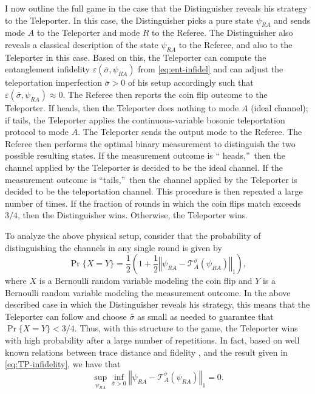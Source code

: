 \documentclass[apsrev,twocolumn]{revtex4-1}%
\begin{document}
I now outline the full game in the case that the Distinguisher reveals his
strategy to the Teleporter. In this case, the Distinguisher picks a pure state
$\psi_{RA}$ and sends mode $A$ to the Teleporter and mode $R$ to the Referee.
The Distinguisher also reveals a classical description of the state $\psi
_{RA}$ to the Referee, and also to the Teleporter in this case. Based on this,
the Teleporter can compute the entanglement infidelity $\varepsilon
(\bar{\sigma},\psi_{RA})$ from \eqref{eq:ent-infidel} and can adjust the
teleportation imperfection $\bar{\sigma}>0$ of his setup accordingly such that
$\varepsilon(\bar{\sigma},\psi_{RA})\approx0 $. The Referee then reports the
coin flip outcome to the Teleporter. If heads, then the Teleporter does
nothing to mode $A$ (ideal channel); if tails, the Teleporter applies the
continuous-variable bosonic teleportation protocol to mode $A$. The Teleporter
sends the output mode to the Referee. The Referee then performs the optimal
binary measurement \cite{H69,H73hel,Hel76} to distinguish the two possible
resulting states. If the measurement outcome is \textquotedblleft
heads,\textquotedblright\ then the channel applied by the Teleporter is
decided to be the ideal channel. If the measurement outcome is
\textquotedblleft tails,\textquotedblright\ then the channel applied by the
Teleporter is decided to be the teleportation channel. This procedure is then
repeated a large number of times. If the fraction of rounds in which the coin
flips match exceeds $3/4$, then the Distinguisher wins. Otherwise, the
Teleporter wins.

To analyze the above physical setup, consider that the probability of
distinguishing the channels in any single round is given by
\cite{H69,H73hel,Hel76}%
\begin{equation}
\Pr\{X=Y\}=\frac{1}{2}\left(  1+\frac{1}{2}\left\Vert \psi_{RA}-\mathcal{T}%
_{A}^{\bar{\sigma}}(\psi_{RA})\right\Vert _{1}\right)  ,
\end{equation}
where $X$ is a Bernoulli random variable modeling the coin flip and $Y$ is a
Bernoulli random variable modeling the measurement outcome. In the above
described case in which the Distinguisher reveals his strategy, this means
that the Teleporter can follow and choose $\bar{\sigma}$ as small as needed to
guarantee that $\Pr\{X=Y\}<3/4$. Thus, with this structure to the game, the
Teleporter wins with high probability after a large number of repetitions. In
fact, based on well known relations between trace distance and fidelity
\cite{Kholevo1972,FG98}, and the result given in \eqref{eq:TP-infidelity}, we
have that%
\begin{equation}
\sup_{\psi_{RA}}\inf_{\bar{\sigma}>0}\left\Vert \psi_{RA}-\mathcal{T}%
_{A}^{\bar{\sigma}}(\psi_{RA})\right\Vert _{1}=0.
\end{equation}
\end{document}
